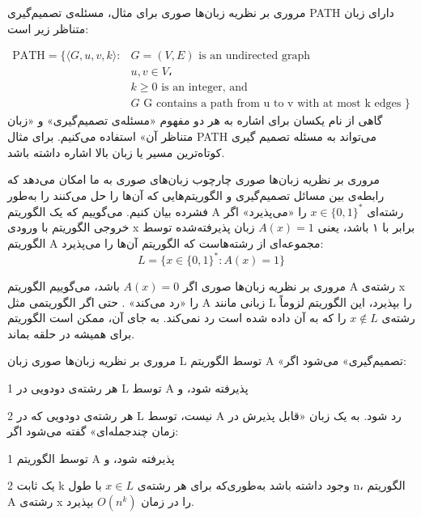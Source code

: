 \begin{itemframe}{مروری بر نظریه زبان‌ها صوری}
\itm
برای مثال، مسئله‌ی تصمیم‌گیری PATH دارای زبان متناظر زیر است:

\begin{align*}
\text{PATH} = \{ \langle G, u, v, k \rangle :  & G = (V, E) \text{ is an undirected graph } \\
				& u, v \in V، \\
				& k \geq 0 \text{ is an integer, and } \\
				& G \text{ G contains a path from u to v with at most k edges }
\}
\end{align*}
\itm
گاهی از نام یکسان برای اشاره به هر دو مفهوم «مسئله‌ی تصمیم‌گیری» و «زبان متناظر آن» استفاده می‌کنیم. برای مثال PATH می‌تواند به مسئله تصمیم گیری کوتاه‌ترین مسیر یا زبان بالا اشاره داشته باشد.
\end{itemframe}

\begin{itemframe}{مروری بر نظریه زبان‌ها صوری}
\itm
چارچوب زبان‌های صوری به ما امکان می‌دهد که رابطه‌ی بین مسائل تصمیم‌گیری و الگوریتم‌هایی که آن‌ها را حل می‌کنند را به‌طور فشرده بیان کنیم.
\itm
می‌گوییم که یک الگوریتم A رشته‌ای
$x \in \{0,1\}^*$
 را «می‌پذیرد»
اگر خروجی الگوریتم با ورودی x برابر با ۱ باشد، یعنی
$A(x) = 1$
زبان پذیرفته‌شده توسط الگوریتم A مجموعه‌ای از رشته‌هاست که الگوریتم آن‌ها را می‌پذیرد:
$$
L = \{ x \in \{0,1\}^* : A(x) = 1 \}
$$
\end{itemframe}

\begin{itemframe}{مروری بر نظریه زبان‌ها صوری}
\itm
اگر
$A(x) = 0$
 باشد، می‌گوییم الگوریتم A رشته‌ی x را «رد می‌کند»
 .
\itm
حتی اگر الگوریتمی مثل A  زبانی مانند L را بپذیرد، این الگوریتم لزوماً رشته‌ی
$x \notin L$
را که به آن داده شده است رد نمی‌کند.
به جای آن، ممکن است الگوریتم برای همیشه در حلقه بماند.
\end{itemframe}

\begin{itemframe}{مروری بر نظریه زبان‌ها صوری}
\itm
زبان L توسط الگوریتم A «تصمیم‌گیری»
 می‌شود اگر:
\item[1]
هر رشته‌ی دودویی در L توسط A پذیرفته شود، و
\item[2]
هر رشته‌ی دودویی که در L نیست، توسط A رد شود.
\itm
به یک زبان «قابل پذیرش در زمان چندجمله‌ای»
گفته می‌شود اگر:
\item[1]
توسط الگوریتم A پذیرفته شود، و
\item[2]
یک ثابت k وجود داشته باشد به‌طوری‌که برای هر رشته‌ی $x \in L$ با طول n، الگوریتم A رشته‌ی x را در زمان $O(n^k)$ بپذیرد.

\end{itemframe}

